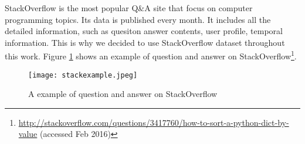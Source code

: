 StackOverflow is the most popular Q\&A site that focus on computer programming topics. Its data is published every month. It includes all the detailed information, such as quesiton answer contents, user profile, temporal information. This is why we decided to use StackOverflow dataset throughout this work. Figure \ref{fig:stackexample} shows an example of question and answer on StackOverflow\footnote{\url{http://stackoverflow.com/questions/3417760/how-to-sort-a-python-dict-by-value} (accessed Feb 2016)}.  
\begin{figure}%
\centering
\texttt{[image: stackexample.jpeg]}  
\caption{A example of question and answer on StackOverflow }
\label{fig:stackexample} 
\end{figure}

